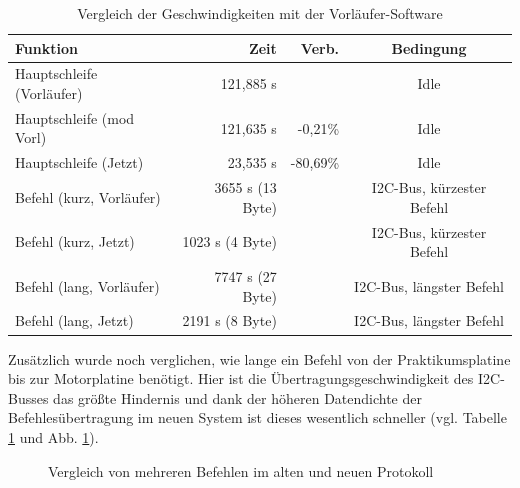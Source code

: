 \begin{table}[htb]
\begin{center}
	\begin{tabular}{|l||r|r|c|}
		\hline
		\textbf{Funktion} & \textbf{Zeit} & \textbf{Verb.} & \textbf{Bedingung} \\ \hline \hline
		Hauptschleife (Vorläufer) & 121,885 \textmu{}s & & Idle \\ \hline
		Hauptschleife (mod Vorl) & 121,635 \textmu{}s & -0,21\% & Idle \\ \hline
		Hauptschleife (Jetzt) & 23,535 \textmu{}s & -80,69\% & Idle \\ \hline \hline
		Befehl (kurz, Vorläufer) & 3655 \textmu{}s (13 Byte) & & I2C-Bus, kürzester Befehl \\ \hline
		Befehl (kurz, Jetzt) & 1023 \textmu{}s (4 Byte) & & I2C-Bus, kürzester Befehl \\ \hline
		Befehl (lang, Vorläufer) & 7747 \textmu{}s (27 Byte) & & I2C-Bus, längster Befehl \\ \hline
		Befehl (lang, Jetzt) & 2191 \textmu{}s (8 Byte) & & I2C-Bus, längster Befehl \\ \hline
	\end{tabular}
	\caption{\label{vergl_speed} Vergleich der Geschwindigkeiten mit der Vorläufer-Software}
\end{center}
\end{table}
Zusätzlich wurde noch verglichen, wie lange ein Befehl von der Praktikumsplatine bis zur Motorplatine benötigt.
Hier ist die Übertragungsgeschwindigkeit des I2C-Busses das größte Hindernis und dank der höheren Datendichte
der Befehlesübertragung im neuen System ist dieses wesentlich schneller (vgl. Tabelle \ref{vergl_speed} und Abb.
 \ref{vergl_befehle}).
\begin{figure}[htb]
 \centering
 \caption{\label{vergl_befehle}Vergleich von mehreren Befehlen im alten und neuen Protokoll}
\end{figure}
